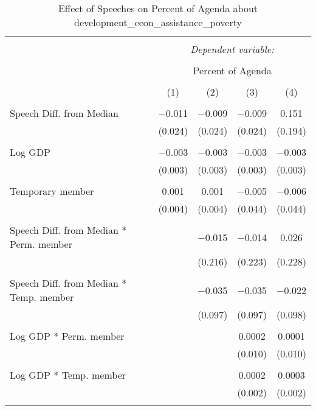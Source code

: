 
\begin{table}[!htbp] \centering 
  \caption{Effect of Speeches on Percent of Agenda about  development_econ_assistance_poverty} 
  \label{} 
\begin{tabular}{@{\extracolsep{5pt}}lcccc} 
\\[-1.8ex]\hline 
\hline \\[-1.8ex] 
 & \multicolumn{4}{c}{\textit{Dependent variable:}} \\ 
\cline{2-5} 
\\[-1.8ex] & \multicolumn{4}{c}{Percent of Agenda} \\ 
\\[-1.8ex] & (1) & (2) & (3) & (4)\\ 
\hline \\[-1.8ex] 
 Speech Diff. from Median & $-$0.011 & $-$0.009 & $-$0.009 & 0.151 \\ 
  & (0.024) & (0.024) & (0.024) & (0.194) \\ 
  & & & & \\ 
 Log GDP & $-$0.003 & $-$0.003 & $-$0.003 & $-$0.003 \\ 
  & (0.003) & (0.003) & (0.003) & (0.003) \\ 
  & & & & \\ 
 Temporary member & 0.001 & 0.001 & $-$0.005 & $-$0.006 \\ 
  & (0.004) & (0.004) & (0.044) & (0.044) \\ 
  & & & & \\ 
 Speech Diff. from Median * Perm. member &  & $-$0.015 & $-$0.014 & 0.026 \\ 
  &  & (0.216) & (0.223) & (0.228) \\ 
  & & & & \\ 
 Speech Diff. from Median * Temp. member &  & $-$0.035 & $-$0.035 & $-$0.022 \\ 
  &  & (0.097) & (0.097) & (0.098) \\ 
  & & & & \\ 
 Log GDP * Perm. member &  &  & 0.0002 & 0.0001 \\ 
  &  &  & (0.010) & (0.010) \\ 
  & & & & \\ 
 Log GDP * Temp. member &  &  & 0.0002 & 0.0003 \\ 
  &  &  & (0.002) & (0.002) \\ 
  & & & & \\ 

\end{tabular}
\end{table}
